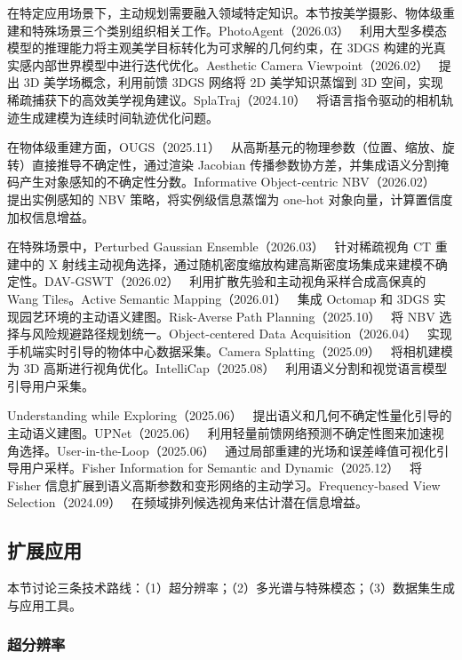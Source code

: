 在特定应用场景下，主动规划需要融入领域特定知识。本节按美学摄影、物体级重建和特殊场景三个类别组织相关工作。PhotoAgent（2026.03）~\cite{2603_22796} 利用大型多模态模型的推理能力将主观美学目标转化为可求解的几何约束，在 3DGS 构建的光真实感内部世界模型中进行迭代优化。Aesthetic Camera Viewpoint（2026.02）~\cite{2602_20363} 提出 3D 美学场概念，利用前馈 3DGS 网络将 2D 美学知识蒸馏到 3D 空间，实现稀疏捕获下的高效美学视角建议。SplaTraj（2024.10）~\cite{2410_06014} 将语言指令驱动的相机轨迹生成建模为连续时间轨迹优化问题。

在物体级重建方面，OUGS（2025.11）~\cite{2511_09397} 从高斯基元的物理参数（位置、缩放、旋转）直接推导不确定性，通过渲染 Jacobian 传播参数协方差，并集成语义分割掩码产生对象感知的不确定性分数。Informative Object-centric NBV（2026.02）~\cite{2602_08266} 提出实例感知的 NBV 策略，将实例级信息蒸馏为 one-hot 对象向量，计算置信度加权信息增益。

在特殊场景中，Perturbed Gaussian Ensemble（2026.03）~\cite{2603_06852} 针对稀疏视角 CT 重建中的 X 射线主动视角选择，通过随机密度缩放构建高斯密度场集成来建模不确定性。DAV-GSWT（2026.02）~\cite{2602_15355} 利用扩散先验和主动视角采样合成高保真的 Wang Tiles。Active Semantic Mapping（2026.01）~\cite{2601_12122} 集成 Octomap 和 3DGS 实现园艺环境的主动语义建图。Risk-Averse Path Planning（2025.10）~\cite{2510_06481} 将 NBV 选择与风险规避路径规划统一。Object-centered Data Acquisition（2026.04）~\cite{2604_19216} 实现手机端实时引导的物体中心数据采集。Camera Splatting（2025.09）~\cite{2509_15677} 将相机建模为 3D 高斯进行视角优化。IntelliCap（2025.08）~\cite{2508_13043} 利用语义分割和视觉语言模型引导用户采集。

Understanding while Exploring（2025.06）~\cite{2506_00225} 提出语义和几何不确定性量化引导的主动语义建图。UPNet（2025.06）~\cite{2506_14856} 利用轻量前馈网络预测不确定性图来加速视角选择。User-in-the-Loop（2025.06）~\cite{2506_21009} 通过局部重建的光场和误差峰值可视化引导用户采样。Fisher Information for Semantic and Dynamic（2025.12）~\cite{2512_22771} 将 Fisher 信息扩展到语义高斯参数和变形网络的主动学习。Frequency-based View Selection（2024.09）~\cite{2409_16470} 在频域排列候选视角来估计潜在信息增益。

\subsection{扩展应用}
\label{ss:12_4b}

本节讨论三条技术路线：（1）超分辨率；（2）多光谱与特殊模态；（3）数据集生成与应用工具。

\subsubsection{超分辨率}


